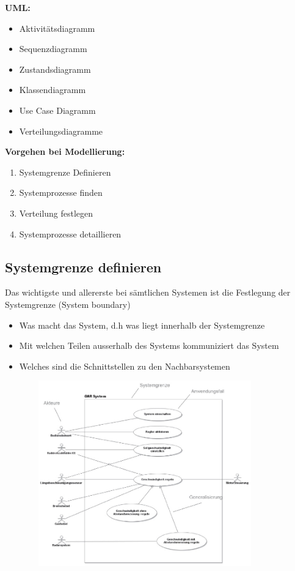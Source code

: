 \begin{multicols}{2}
	\textbf{UML:}
	\begin{itemize}
		\item Aktivitätsdiagramm
		\item Sequenzdiagramm
		\item Zustandsdiagramm
		\item Klassendiagramm
		\item Use Case Diagramm
		\item Verteilungsdiagramme
	\end{itemize}
	\columnbreak
	
	\textbf{Vorgehen bei Modellierung:}
	\begin{enumerate}
		\item Systemgrenze Definieren
		\item Systemprozesse finden
		\item Verteilung festlegen
		\item Systemprozesse detaillieren
	\end{enumerate}
\end{multicols}

\subsection{Systemgrenze definieren}
Das wichtigste und allererste bei sämtlichen Systemen ist die Festlegung der Systemgrenze (System boundary)
\begin{itemize}
	\item Was macht das System, d.h was liegt innerhalb der Systemgrenze
	\item Mit welchen Teilen ausserhalb des Systems kommuniziert das System
	\item Welches sind die Schnittstellen zu den Nachbarsystemen
\end{itemize}


\begin{figure}[htbp]
	\centering
	{\includegraphics[height=8cm, width = 10cm,]{images/Modellierung/Systemgrenze} 	
	\label{fig:Systemgrenze}}
\end{figure} 


